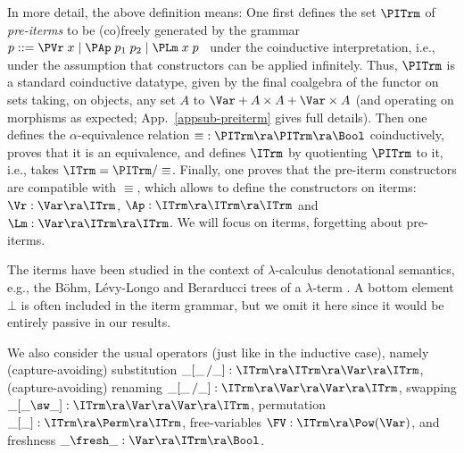 In more detail, the above definition means: One first defines  the set $\PITrm$ of 
\emph{pre-iterms} to be (co)freely generated by the %
grammar \ $p ::= \PVr\;x  \mid \PAp\;p_1\;p_2  \mid \PLm\;x\;p$ \ 
under the coinductive interpretation, i.e., under the assumption that constructors can be applied infinitely. 
%
Thus, %
$\PITrm$ is a standard coinductive datatype, given by the final coalgebra of the functor on sets taking, on objects, any set $A$ to 
$\Var + A \times A + \Var \times A$ (and operating on morphisms as expected; 
App.~\ref{appsub-preiterm} 
gives full details). 
%
Then one defines the $\alpha$-equivalence relation 
$\equiv\; : 
\PITrm \ra \PITrm \ra 
\Bool$  coinductively, proves that it 
is an equivalence, and defines $\ITrm$ by quotienting $\PITrm$ to %
it, i.e., takes $\ITrm = \PITrm/\equiv$. 
%
Finally, one proves that the pre-iterm constructors are compatible with $\equiv$, 
which allows to define the constructors on iterms:  
$\Vr : \Var \ra \ITrm$, $\Ap : \ITrm \ra \ITrm \ra \ITrm$ 
and $\Lm : \Var \ra \ITrm \ra \ITrm$.   
%
We will %
focus on iterms, forgetting about pre-iterms.

The iterms have been 
studied %
in the context of $\lambda$-calculus denotational semantics, 
e.g., 
the B\"{o}hm, L\'{e}vy-Longo and Berarducci trees  %
of a $\lambda$-term \cite{bar-lam}. A bottom element $\bot$ is often included in the iterm grammar, but we omit it here since it would be entirely passive in our results.  %
\looseness=-1

We also consider the usual operators (just like in the inductive case), namely 
(capture-avoiding) substitution  
	$\_[\_\,/\_] : \ITrm \ra \ITrm \ra \Var \ra \ITrm$, 
	(capture-avoiding) renaming  
	$\_[\_\,/\_] : \ITrm \ra \Var \ra \Var \ra \ITrm$,  
 swapping  
	$\_[\_\sw\_] : \ITrm \ra \Var \ra \Var \ra \ITrm$, 
permutation $\_[\_] : \ITrm \ra \Perm \ra \ITrm$, 
free-variables %
	$\FV : \ITrm \ra \Pow(\Var)$, 
and freshness $\_\fresh\_ : \Var \ra \ITrm \ra \Bool$. 
%

